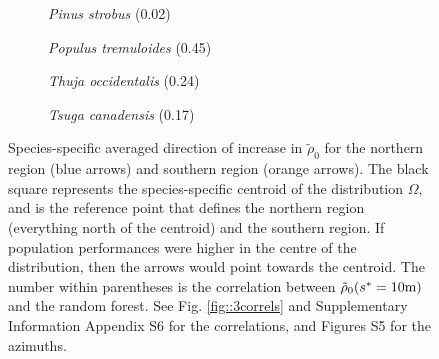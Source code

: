 \begin{figure}[htb]
\begin{subfigure}{0.3\textwidth}
		\label{fig::pinban_az}
	\end{subfigure}
	\hfil
	\begin{subfigure}{0.3\textwidth}
		\centering
		
		\caption{\textit{Pinus strobus} (0.02)}
		\label{fig::pinstr_az}
	\end{subfigure}
	\hfil
	\begin{subfigure}{0.3\textwidth}
		\centering
		
		\caption{\textit{Populus tremuloides} (0.45)}
		\label{fig::poptre_az}
	\end{subfigure}
	\medskip
	\begin{subfigure}{0.3\textwidth}
		\centering
		
		\caption{\textit{Thuja occidentalis} (0.24)}
		\label{fig::thuocc_az}
	\end{subfigure}
	\hfil
	\begin{subfigure}{0.3\textwidth}
		\centering
		
		\caption{\textit{Tsuga canadensis} (0.17)}
		\label{fig::tsucan_az}
	\end{subfigure}
	\hfil
	\begin{subfigure}{0.3\textwidth}
		\centering
		
	\end{subfigure}
	\caption{Species-specific averaged direction of increase in $ \tilde \rho_0 $ for the northern region (blue arrows) and southern region (orange arrows). The black square represents the species-specific centroid of the distribution $ \Omega $, and is the reference point that defines the northern region (everything north of the centroid) and the southern region. If population performances were higher in the centre of the distribution, then the arrows would point towards the centroid. The number within parentheses is the correlation between $ \tilde \rho_0({s}^{*} = 10 \text{m}) $ and the random forest. See Fig. \ref{fig::3correls} and Supplementary Information Appendix S6 for the correlations, and Figures S5 for the azimuths. \label{fig::grad_cols}}
\end{figure}

